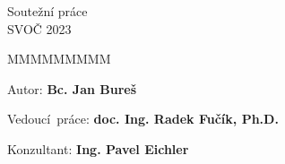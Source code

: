 {%
\vspace{2cm}

{\large{}Soutežní práce \\ SVOČ 2023}{\large\par}
\vfill{}

\begin{lyxlist}{MMMMMMMMM}
	\begin{singlespace}
		\item [{Autor:}] \textbf{Bc. Jan Bureš}
		\item [{Vedoucí~práce:}] \textbf{doc. Ing. Radek Fučík, Ph.D.}
		\item [{Konzultant:}] \textbf{Ing. Pavel Eichler}
	\end{singlespace}
\end{lyxlist}
}



~\newpage{}

~

\vfill{}
